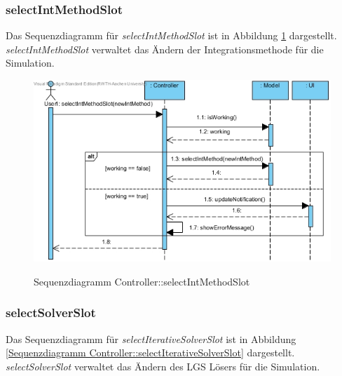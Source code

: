 \subsubsection*{selectIntMethodSlot}

Das Sequenzdiagramm für \emph{selectIntMethodSlot} ist in Abbildung \ref{Sequenzdiagramm Controller::selectIntMethodSlot} dargestellt. \emph{selectIntMethodSlot} verwaltet das Ändern der Integrationsmethode für die Simulation.

\begin{figure}[H]
	\centering
	\includegraphics[scale=.7]{Bilder/Controller__selectIntMethodSlot().jpg}\\
	\caption{Sequenzdiagramm Controller::selectIntMethodSlot}
	\label{Sequenzdiagramm Controller::selectIntMethodSlot}
\end{figure}

\subsubsection*{selectSolverSlot}

Das Sequenzdiagramm für \emph{selectIterativeSolverSlot} ist in Abbildung \ref{Sequenzdiagramm Controller::selectIterativeSolverSlot} dargestellt. \emph{selectSolverSlot} verwaltet das Ändern des LGS Lösers für die Simulation.

